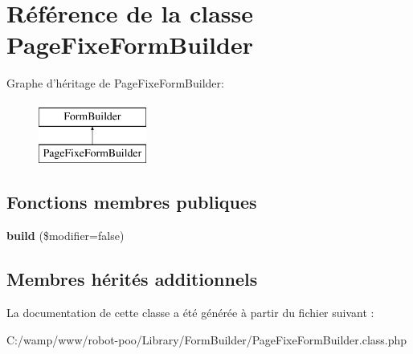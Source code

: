 \hypertarget{class_library_1_1_form_builder_1_1_page_fixe_form_builder}{\section{Référence de la classe Page\+Fixe\+Form\+Builder}
\label{class_library_1_1_form_builder_1_1_page_fixe_form_builder}
}
Graphe d'héritage de Page\+Fixe\+Form\+Builder\+:\begin{figure}[H]
\begin{center}
\leavevmode
\includegraphics[height=2.000000cm]{class_library_1_1_form_builder_1_1_page_fixe_form_builder}
\end{center}
\end{figure}
\subsection*{Fonctions membres publiques}
\begin{DoxyCompactItemize}
\item 
\hypertarget{class_library_1_1_form_builder_1_1_page_fixe_form_builder_a95db8a55df965927a029b12f811339b3}{{\bfseries build} (\$modifier=false)}\label{class_library_1_1_form_builder_1_1_page_fixe_form_builder_a95db8a55df965927a029b12f811339b3}

\end{DoxyCompactItemize}
\subsection*{Membres hérités additionnels}


La documentation de cette classe a été générée à partir du fichier suivant \+:\begin{DoxyCompactItemize}
\item 
C\+:/wamp/www/robot-\/poo/\+Library/\+Form\+Builder/Page\+Fixe\+Form\+Builder.\+class.\+php\end{DoxyCompactItemize}
